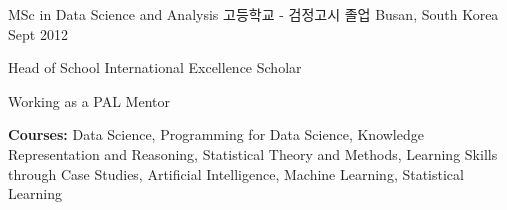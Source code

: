 

\begin{cventries}

  \cventry
    {MSc in Data Science and Analysis} %
    {고등학교 - 검정고시 졸업} %
    {Busan, South Korea} %
    {Sept 2012} %
    {
      \begin{cvitems} %
        \item {Head of School International Excellence Scholar}
        \item {Working as a PAL Mentor}
        \item {\textbf{Courses:} Data Science, Programming for Data Science, Knowledge Representation and Reasoning, Statistical Theory and Methods, Learning Skills through Case Studies, Artificial Intelligence, Machine Learning, Statistical Learning}
      \end{cvitems}
    }
\end{cventries}
